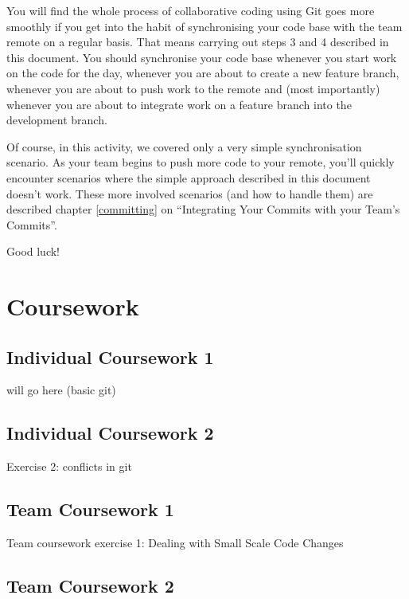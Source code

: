 \documentclass[
]{book}
\begin{document}
You will find the whole process of collaborative coding using Git goes more smoothly if you get into the habit of synchronising your code base with the team remote on a regular basis. That means carrying out steps 3 and 4 described in this document. You should synchronise your code base whenever you start work on the code for the day, whenever you are about to create a new feature branch, whenever you are about to push work to the remote and (most importantly) whenever you are about to integrate work on a feature branch into the development branch.

Of course, in this activity, we covered only a very simple synchronisation scenario. As your team begins to push more code to your remote, you'll quickly encounter scenarios where the simple approach described in this document doesn't work. These more involved scenarios (and how to handle them) are described chapter \ref{committing} on ``Integrating Your Commits with your Team's Commits''.

Good luck!

\hypertarget{part-coursework}{%
\part{Coursework}\label{part-coursework}}

\hypertarget{gitting}{%
\chapter{Individual Coursework 1}\label{gitting}}

will go here (basic git)

\hypertarget{conflicting}{%
\chapter{Individual Coursework 2}\label{conflicting}}

Exercise 2: conflicts in git

\hypertarget{dealing}{%
\chapter{Team Coursework 1}\label{dealing}}

Team coursework exercise 1: Dealing with Small Scale Code Changes

\hypertarget{working}{%
\chapter{Team Coursework 2}\label{working}}
\end{document}
